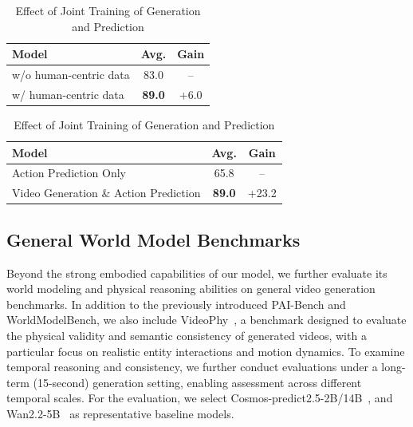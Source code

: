 \begin{table}[t]
\centering

\begin{minipage}[t]{0.48\textwidth}
\vspace{0pt}
\centering
\caption{Effect of embodied human-centric pretraining}
\label{tab:human_pretraining}

\footnotesize
\setlength{\tabcolsep}{4pt}

\begin{tabular}{lcc}
\toprule
\textbf{Model} &
\textbf{Avg.} &
\textbf{Gain} \\
\midrule
w/o human-centric data & 83.0 & -- \\
w/ human-centric data & \textbf{89.0} & +6.0 \\
\bottomrule
\end{tabular}

\end{minipage}
\hfill
\begin{minipage}[t]{0.48\textwidth}
\vspace{0pt}
\centering
\caption{Effect of Joint Training of Generation and Prediction}
\label{tab:joint_training}

\footnotesize
\setlength{\tabcolsep}{4pt}

\begin{tabular}{lcc}
\toprule
\textbf{Model} & \textbf{Avg.} & \textbf{Gain} \\
\midrule
Action Prediction Only & 65.8 & -- \\
Video Generation \& Action Prediction & \textbf{89.0} & +23.2 \\
\bottomrule
\end{tabular}

\end{minipage}

\end{table}



\subsection{General World Model Benchmarks}
Beyond the strong embodied capabilities of our model, we further evaluate its world modeling and physical reasoning abilities on general video generation benchmarks. In addition to the previously introduced PAI-Bench and WorldModelBench, we also include VideoPhy~\cite{bansal2024videophy}, a benchmark designed to evaluate the physical validity and semantic consistency of generated videos, with a particular focus on realistic entity interactions and motion dynamics. To examine temporal reasoning and consistency, we further conduct evaluations under a long-term (15-second) generation setting, enabling assessment across different temporal scales. For the evaluation, we select Cosmos-predict2.5-2B/14B~\cite{nvidia2025worldsimulationvideofoundation}, and Wan2.2-5B~\cite{wan2025} as representative baseline models.

